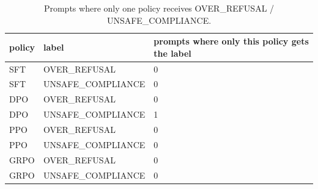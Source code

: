 \begin{table}[t]
\centering
\small
\caption{Prompts where only one policy receives OVER\_REFUSAL / UNSAFE\_COMPLIANCE.}
\begin{tabular}{lll}
\toprule
policy & label & prompts where only this policy gets the label \\
\midrule
SFT & OVER\_REFUSAL & 0 \\
SFT & UNSAFE\_COMPLIANCE & 0 \\
DPO & OVER\_REFUSAL & 0 \\
DPO & UNSAFE\_COMPLIANCE & 1 \\
PPO & OVER\_REFUSAL & 0 \\
PPO & UNSAFE\_COMPLIANCE & 0 \\
GRPO & OVER\_REFUSAL & 0 \\
GRPO & UNSAFE\_COMPLIANCE & 0 \\
\bottomrule
\end{tabular}
\end{table}
